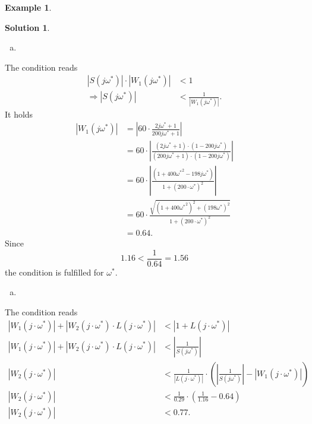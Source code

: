 \documentclass[a4paper,12 pt]{article}
\numberwithin{equation}{section}
\theoremstyle{definition}
\newtheorem{bsp}{Example}
\theoremstyle{remark}
\theoremstyle{definition}
\newtheorem*{lsg}{Solution}
\theoremstyle{definition}
\theoremstyle{definition}
\theoremstyle{remark}
\begin{document}
\begin{bsp}
\begin{lsg}
\begin{equation*}
\end{equation*}

\begin{enumerate}[(b)]
\item 
\end{enumerate}
The condition reads
\begin{equation*}
\begin{split}
|S(j\omega^*)|\cdot |W_1(j\omega^*)|&<1\\
\Rightarrow|S(j\omega^*)|&< \frac{1}{|W_1(j\omega^*)|}.
\end{split}

\end{equation*}
It holds
\begin{equation*}
\begin{split}
|W_1(j\omega^*)|&=\left| 60\cdot \frac{2j\omega^*+1}{200j\omega^*+1} \right|\\
&=60\cdot \left| \frac{(2j\omega^*+1)\cdot (1-200j\omega^*)}{(200j\omega^*+1)\cdot (1-200j\omega^*)} \right|\\
&=60\cdot \left| \frac{(1+400{\omega^*}^2-198j\omega^*)}{1+(200\cdot \omega^*)^2}\right|\\
&=60\cdot \frac{\sqrt{(1+400{\omega^*}^2)^2+(198\omega^*)^2}}{1+(200\cdot \omega^*)^2}\\
&=0.64.
\end{split}
\end{equation*}
Since
$$1.16<\frac{1}{0.64}=1.56$$
the condition is fulfilled for $\omega^*$.
\begin{enumerate}[(c)]
\newpage
\item 
\end{enumerate}
The condition reads
\begin{equation*}
\begin{split}
|W_1(j\cdot \omega^*)| +|W_2(j\cdot \omega^*) \cdot L(j\cdot \omega^*)|&<|1+L(j\cdot \omega^*)|\\
|W_1(j\cdot \omega^*)| +|W_2(j\cdot \omega^*) \cdot L(j\cdot \omega^*)|&<\left| \frac{1}{S(j\omega^*)} \right| \\
|W_2(j\cdot \omega^*)|&< \frac{1}{|L(j\cdot \omega^*)|}\cdot \left( \left| \frac{1}{S(j\omega^*)}\right|-|W_1(j\cdot \omega^*)|\right)\\
|W_2(j\cdot \omega^*)|&<\frac{1}{0.29}\cdot \left( \frac{1}{1.16}-0.64 \right)\\
|W_2(j\cdot \omega^*)|&<0.77.
\end{split}
\end{equation*}



\end{lsg}


\end{bsp}
\newpage
\end{document}
